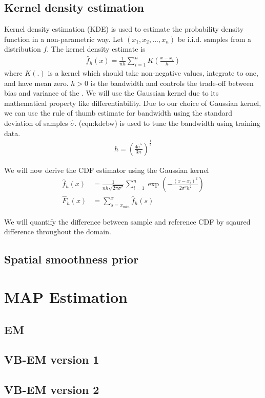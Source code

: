 \subsection{Kernel density estimation}
Kernel density estimation (KDE) is used to estimate the probability density function in a non-parametric way. Let $\left( x_1, x_2, ..., x_n\right)$ be i.i.d. samples from a distribution $f$. The kernel density estimate is
\begin{align}
    \hat{f}_h (x) = \frac{1}{nh} \sum_{i=1}^{n} K\left(\frac{x-x_i}{h}\right) \label{eqn:kde}
\end{align}
where $K(.)$ is a kernel which should take non-negative values, integrate to one, and have mean zero. $h > 0$ is the bandwidth and controls the trade-off between bias and variance of the . We will use the Gaussian kernel due to its mathematical property like differentiability. Due to our choice of Gaussian kernel, we can use the rule of thumb estimate \cite{silverman1986density} for bandwidth using the standard deviation of samples $\hat{\sigma}$. \Eqref(eqn:kdebw) is used to tune the bandwidth using training data.
\begin{align}
    h = \left( \frac{4 \hat{\sigma}^5}{3n}\right)^{\frac{1}{5}} \label{eqn:kdebw}
\end{align}

We will now derive the CDF estimator using the Gaussian kernel
\begin{align}
    \hat{f}_h (x) &= \frac{1}{nh \sqrt{2 \pi \sigma^2}} \sum_{i=1}^{n} \exp \left( -\frac{(x-x_i)^2} {2 \sigma^2 h^2}\right) \\
    \hat{F}_h (x) &= \sum_{s=x_{min}}^{x} \hat{f}_h (s) \label{eqn:kdecdf}
\end{align}

We will quantify the difference between sample and reference CDF by sqaured difference throughout the domain.


\subsection{Spatial smoothness prior}

\section{MAP Estimation}

\subsection{EM}

\subsection{VB-EM version 1}
\subsection{VB-EM version 2}
